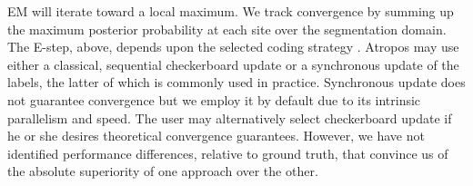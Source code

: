 \documentclass[11pt,english]{article}
\newcommand{\argmax}{\operatornamewithlimits{argmax}}
\begin{document}
EM will iterate toward a local maximum.  We track convergence by
summing up the maximum posterior probability at each site over the
segmentation domain.  The E-step, above, depends upon the selected
coding strategy \citep{Besag1986}.  Atropos may use either a
classical, sequential checkerboard update or a synchronous update of
the labels, the latter of which is commonly used in practice.
Synchronous update does not guarantee convergence but we employ it by
default due to its intrinsic parallelism and speed.  The user may
alternatively select checkerboard update if he or she desires
theoretical convergence guarantees.  However, we have not identified
performance differences, relative to ground truth, that convince us of
the absolute superiority of one approach over the other.
%
%
%
\end{document}
